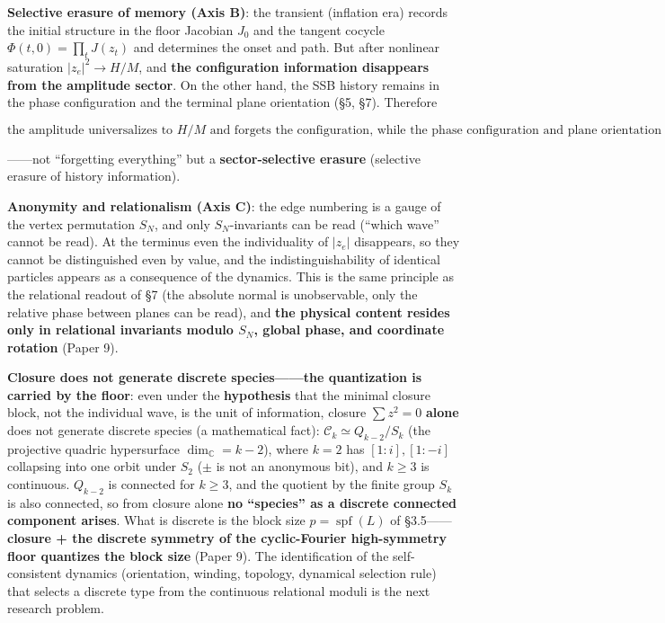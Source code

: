 \documentclass[
  a4paper,
]{ltjsarticle}
\begin{document}
\textbf{Selective erasure of memory (Axis B)}: the transient (inflation
era) records the initial structure in the floor Jacobian \(J_0\) and the
tangent cocycle \(\Phi(t,0)=\prod_t J(z_t)\) and determines the onset
and path. But after nonlinear saturation \(|z_e|^2\to H/M\), and
\textbf{the configuration information disappears from the amplitude
sector}. On the other hand, the SSB history remains in the phase
configuration and the terminal plane orientation (§5, §7). Therefore

\[\boxed{\text{the amplitude universalizes to }H/M\text{ and forgets the configuration, while the phase configuration and plane orientation retain the SSB history}}\]

------not ``forgetting everything'' but a \textbf{sector-selective
erasure} (selective erasure of history information).

\textbf{Anonymity and relationalism (Axis C)}: the edge numbering is a
gauge of the vertex permutation \(S_N\), and only \(S_N\)-invariants can
be read (``which wave'' cannot be read). At the terminus even the
individuality of \(|z_e|\) disappears, so they cannot be distinguished
even by value, and the indistinguishability of identical particles
appears as a consequence of the dynamics. This is the same principle as
the relational readout of §7 (the absolute normal is unobservable, only
the relative phase between planes can be read), and \textbf{the physical
content resides only in relational invariants modulo \(S_N\), global
phase, and coordinate rotation} (Paper 9).

\textbf{Closure does not generate discrete species------the quantization
is carried by the floor}: even under the \textbf{hypothesis} that the
minimal closure block, not the individual wave, is the unit of
information, closure \(\sum z^2=0\) \textbf{alone} does not generate
discrete species (a mathematical fact):
\(\mathcal C_k\simeq Q_{k-2}/S_k\) (the projective quadric hypersurface
\(\dim_{\mathbb C}=k-2\)), where \(k=2\) has \([1{:}i],[1{:}{-}i]\)
collapsing into one orbit under \(S_2\) (\(\pm\) is not an anonymous
bit), and \(k\ge3\) is continuous. \(Q_{k-2}\) is connected for
\(k\ge3\), and the quotient by the finite group \(S_k\) is also
connected, so from closure alone \textbf{no ``species'' as a discrete
connected component arises}. What is discrete is the block size
\(p=\operatorname{spf}(L)\) of §3.5------\textbf{closure + the discrete
symmetry of the cyclic-Fourier high-symmetry floor quantizes the block
size} (Paper 9). The identification of the self-consistent dynamics
(orientation, winding, topology, dynamical selection rule) that selects
a discrete type from the continuous relational moduli is the next
research problem.
\end{document}
